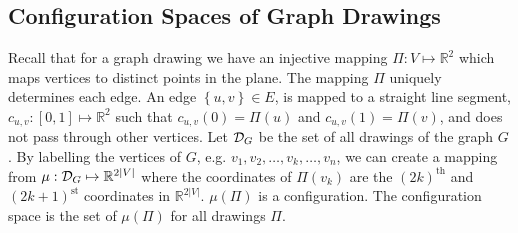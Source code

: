 \documentclass[10pt]{CSUNthesis}
\theoremstyle{plain}%
\theoremstyle{definition}
\theoremstyle{remark}
\newcommand{\DD}{{\cal D}} %
\newcommand{\bbR}{{\mathbb{R}}}
\newcommand{\curlybraces}[1]{\left\lbrace #1 \right\rbrace}
\begin{document}





\subsection{Configuration Spaces of Graph Drawings}
Recall that for a graph drawing we have an injective mapping $\Pi : V \mapsto \bbR^{2}$ which maps vertices to distinct points in the plane.  %
The mapping $\Pi$ uniquely determines each edge.
An edge $\curlybraces{u,v} \in E$, is mapped to a straight line segment, $c_{u,v}:[0,1]\mapsto \bbR^2$ such that $c_{u,v}(0) = \Pi(u)$ and $c_{u,v}(1) = \Pi(v)$, and does not pass through other vertices.
Let $\DD_G$ be the set of all drawings of the graph $G$.  
By labelling the vertices of $G$, e.g. $v_1, v_2, \dots, v_k, \dots, v_{n}$, we can create a mapping from $\mu: \DD_G \mapsto \bbR^{2\vert V \vert}$ where the coordinates of $\Pi(v_k)$ are the $(2k)^\text{th}$ and $(2k+1)^\text{st}$ coordinates in $\bbR^{2\vert V \vert}$.  
$\mu(\Pi)$ is a configuration.
The configuration space is the set of $\mu(\Pi)$ for all drawings $\Pi$.  
\end{document}
